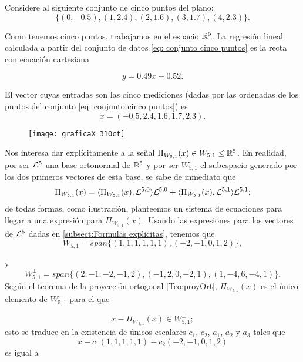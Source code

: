 \begin{ejemplo}
Considere al siguiente conjunto de cinco
puntos del plano:
\begin{equation} \label{eq: conjunto cinco puntos}
\{ (0,-0.5), (1,2.4), (2, 1.6), (3,1.7), (4, 2.3) \}.
\end{equation}


Como tenemos cinco puntos, trabajamos
en el espacio $\mathbb{R}^{5}$. 
La regresión lineal calculada a partir
del conjunto de datos
\eqref{eq: conjunto cinco puntos}
es la recta
con ecuación cartesiana

\begin{equation} \label{eq: recta minimos cuadrados}
y=0.49x+0.52.
\end{equation}

El vector cuyas entradas
son las cinco mediciones (dadas por las ordenadas
de los puntos del conjunto \eqref{eq: conjunto cinco puntos})
es
\begin{equation}
\label{eq0: 29Nov}
x=(-0.5, 2.4, 1.6, 1.7, 2.3).
\end{equation}


\begin{figure}[H]
	\centering
	\texttt{[image: graficaX\_31Oct]} 
\end{figure}	


Nos interesa
dar explícitamente a 
la señal $\Pi_{W_{5,1}}(x) \in W_{5,1} \leq \mathbb{R}^{5}$.
En realidad, por ser $\mathcal{L}^{5}$ 
una base ortonormal de $\mathbb{R}^{5}$ y por ser
$W_{5,1}$ el subespacio generado por los
dos primeros vectores de esta base, 
se sabe de inmediato que
\[
\Pi_{W_{5,1}}(x)=  \langle \Pi_{W_{5,1}}(x), \mathcal{L}^{5,0} \rangle \mathcal{L}^{5,0}
+ \langle \Pi_{W_{5,1}}(x), \mathcal{L}^{5,1} \rangle \mathcal{L}^{5,1};
\]
de todas formas, como ilustración, planteemos un sistema
de ecuaciones para llegar a una expresión para
$\Pi_{W_{5,1}}(x)$.
Usando las expresiones para los vectores
de $\mathcal{L}^{5}$
dadas en \ref{subsect:Formulas explicitas},
tenemos que
\[
W_{5,1}=span\{ (1,1,1,1,1,1), (-2, -1, 0, 1, 2) \},
\]

y 
\[
W_{5,1}^{\perp}=span\{ (2,-1,-2,-1,2), (-1,2,0,-2,1), (1,-4,6,-4,1)\}.
\]
Según el teorema de la proyección ortogonal \ref{Teo:proyOrt},
$\Pi_{W_{5,1}}(x)$ es el único elemento de $W_{5,1}$ para el 
que 

\[
x-\Pi_{W_{5,1}}(x) \in W_{5,1}^{\perp};
\]
esto se 
traduce en la existencia de 
únicos escalares $c_{1}$, $c_{2}$,
$a_{1}$, $a_{2}$ y $a_{3}$ tales que
\[
x-c_{1}(1,1,1,1,1)-c_{2}(-2, -1, 0, 1, 2)
\]
es igual a 


\end{ejemplo}
